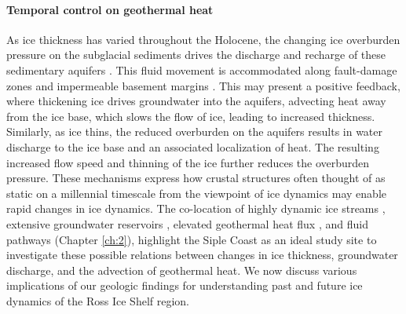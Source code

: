 \paragraph*{Temporal control on geothermal heat}
As ice thickness has varied throughout the Holocene, the changing ice overburden pressure on the subglacial sediments drives the discharge and recharge of these sedimentary aquifers \citep{goochpotential2016, lisedimentary2022}. This fluid movement is accommodated along fault-damage zones and impermeable basement margins \citep[Figure \ref{fig:chp5_syntheis_figure}][]{joliegeological2021}. This may present a positive feedback, where thickening ice drives groundwater into the aquifers, advecting heat away from the ice base, which slows the flow of ice, leading to increased thickness. Similarly, as ice thins, the reduced overburden on the aquifers results in water discharge to the ice base and an associated localization of heat. The resulting increased flow speed and thinning of the ice further reduces the overburden pressure. These mechanisms express how crustal structures often thought of as static on a millennial timescale from the viewpoint of ice dynamics may enable rapid changes in ice dynamics. The co-location of highly dynamic ice streams \citep{bougamontreactivation2015, cataniavariability2012}, extensive groundwater reservoirs \citep{gustafsondynamic2022, christoffersensignificant2014}, elevated geothermal heat flux \citep{shengeothermal2020, burton-johnsongeothermal2020}, and fluid pathways (Chapter \ref{ch:2}), highlight the Siple Coast as an ideal study site to investigate these possible relations between changes in ice thickness, groundwater discharge, and the advection of geothermal heat. We now discuss various implications of our geologic findings for understanding past and future ice dynamics of the Ross Ice Shelf region. \\

